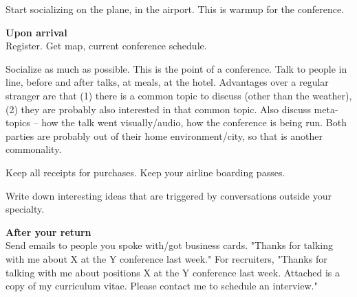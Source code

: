 Start socializing on the plane, in the airport. This is warmup for the conference.

\textbf{Upon arrival}\\

Register. Get map, current conference schedule.

Socialize as much as possible. This is the point of a conference. Talk to people in line, before and after talks, at meals, at the hotel. Advantages over a regular stranger are that (1) there is a common topic to discuss (other than the weather), (2) they are probably also interested in that common topic. Also discuss meta-topics -- how the talk went visually/audio, how the conference is being run. Both parties are probably out of their home environment/city, so that is another commonality.


Keep all receipts for purchases. Keep your airline boarding passes.

Write down interesting ideas that are triggered by conversations outside your specialty.


\textbf{After your return}\\

Send emails to people you spoke with/got business cards. "Thanks for talking with me about X at the Y conference last week."
For recruiters, "Thanks for talking with me about positions X at the Y conference last week. Attached is a copy of my curriculum vitae. Please contact me to schedule an interview."